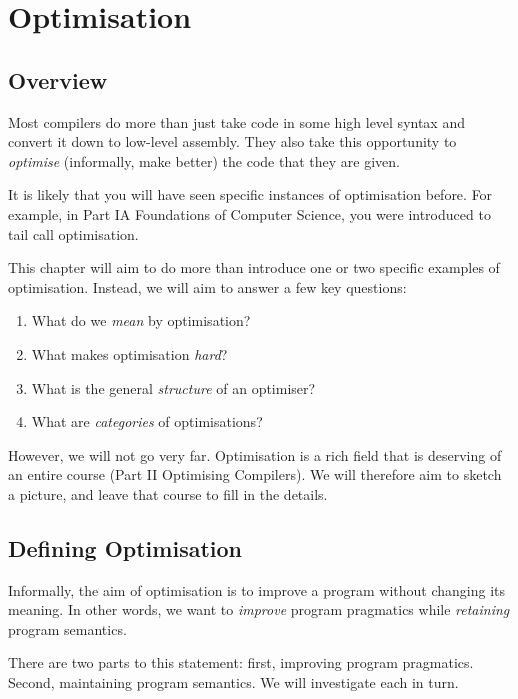 \chapter{Optimisation}

\section{Overview}
Most compilers do more than just take code in some high level syntax and convert it down to low-level assembly. They also take this opportunity to \textit{optimise} (informally, make better) the code that they are given.

It is likely that you will have seen specific instances of optimisation before. For example, in \textsf{Part IA Foundations of Computer Science}, you were introduced to tail call optimisation. 

This chapter will aim to do more than introduce one or two specific examples of optimisation. Instead, we will aim to answer a few key questions:
\begin{enumerate}
    \item What do we \textit{mean} by optimisation?
    \item What makes optimisation \textit{hard}?
    \item What is the general \textit{structure} of an optimiser?
    \item What are \textit{categories} of optimisations?
\end{enumerate}

However, we will not go very far. Optimisation is a rich field that is deserving of an entire course (\textsf{Part II Optimising Compilers}). We will therefore aim to sketch a picture, and leave that course to fill in the details. 

\section{Defining Optimisation}
Informally, the aim of optimisation is to improve a program without changing its meaning. In other words, we want to \textit{improve} program pragmatics while \textit{retaining} program semantics. 

There are two parts to this statement: first, improving program pragmatics. Second, maintaining program semantics. We will investigate each in turn. 

